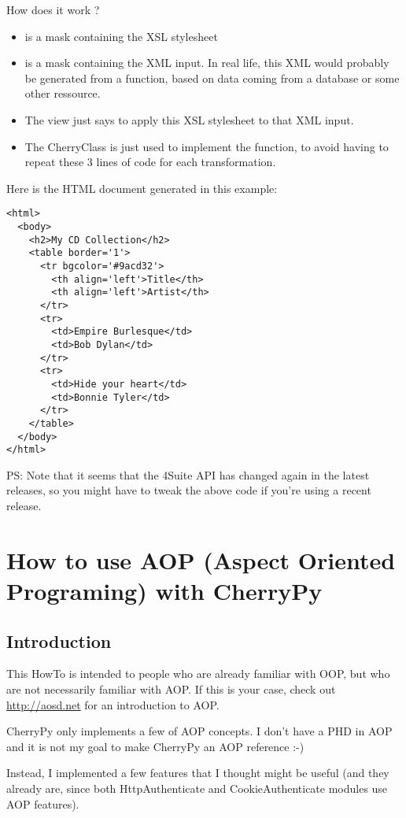 \documentclass{manual}
\begin{document}
How does it work ?
\begin{itemize}
\item
{} is a mask containing the XSL stylesheet
\item
{} is a mask containing the XML input. In real life, this XML would probably be generated from a function,
based on data coming from a database or some other ressource.
\item
The  view just says to apply this XSL stylesheet to that XML input.
\item
The  CherryClass is just used to implement the  function, to avoid having to repeat
these 3 lines of code for each transformation.
\end{itemize}

Here is the HTML document generated in this example:
\begin{verbatim}
<html>
  <body>
    <h2>My CD Collection</h2>
    <table border='1'>
      <tr bgcolor='#9acd32'>
        <th align='left'>Title</th>
        <th align='left'>Artist</th>
      </tr>
      <tr>
        <td>Empire Burlesque</td>
        <td>Bob Dylan</td>
      </tr>
      <tr>
        <td>Hide your heart</td>
        <td>Bonnie Tyler</td>
      </tr>
    </table>
  </body>
</html>
\end{verbatim}

PS: Note that it seems that the 4Suite API has changed again in the latest releases, so you might have to tweak the above code if you're using a recent release.

\chapter{How to use AOP (Aspect Oriented Programing) with CherryPy}

\section{Introduction}
This HowTo is intended to people who are already familiar with OOP, but who are not necessarily familiar with AOP.
If this is your case, check out \url{http://aosd.net} for an introduction to AOP.

CherryPy only implements a few of AOP concepts. I don't have a PHD in AOP and it is not my goal to make
CherryPy an AOP reference :-)

Instead, I implemented a few features that I thought might be useful (and they already are, since both
HttpAuthenticate and CookieAuthenticate modules use AOP features).
\end{document}
